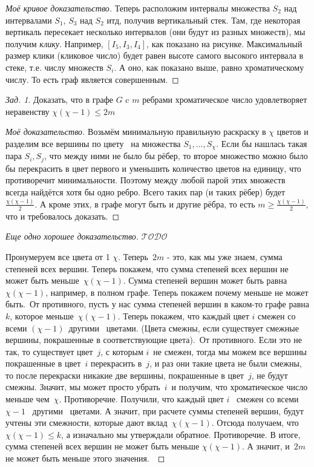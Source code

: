\documentclass[a4paper,12pt]{article}
\numberwithin{figure}{section}
\theoremstyle{remark}
\newtheorem{problem}{Зад.}[section]
\def\iiTODO{\guillemotleft$\mathcal{TODO}$\guillemotright\textellipsis}
\begin{document}
\begin{proof}[Моё кривое доказательство]
	Теперь расположим интервалы множества $S_2$ над интервалами $S_1$, $S_3$ над $S_2$ итд, получив вертикальный стек. Там, где некоторая вертикаль пересекает несколько интервалов (они будут из разных множеств), мы получим \textit{клику}. Например, $[I_5,I_3,I_4]$, как показано на рисунке. Максимальный размер клики (кликовое число) будет равен высоте самого высокого интервала в стеке, т.е. числу множеств $S_i$. А оно, как показано выше, равно хроматическому числу. То есть граф является совершенным.
\end{proof}


\begin{problem}
	Доказать, что в графе $G$ c $m$ ребрами хроматическое число удовлетворяет неравенству $\chi(\chi-1) \leqslant 2m$
\end{problem}

\begin{proof}[Моё доказательство]
	Возьмём минимальную правильную раскраску в $\chi$ цветов и разделим все вершины по цвету  на множества $S_1,...,S_{\chi}$. Если бы нашлась такая пара $S_i,S_j$, что между ними не было бы рёбер, то второе множество можно было бы перекрасить в цвет первого и уменьшить количество цветов на единицу, что противоречит минимальности. Поэтому между любой парой этих множеств всегда найдётся хотя бы одно ребро. Всего таких пар (и таких рёбер) будет $\displaystyle\frac{\chi(\chi-1)}{2}$. А кроме этих, в графе могут быть и другие рёбра, то есть $\displaystyle m \geqslant \frac{\chi(\chi-1)}2$, что и требовалось доказать.
\end{proof}

\begin{proof}[Еще одно хорошее доказательство]
	\iiTODO
	
	Пронумеруем все цвета от 1 $\chi$. Теперь $2m$ - это, как мы уже знаем, сумма степеней всех вершин. Теперь покажем, что сумма степеней всех вершин не может быть меньше $\chi(\chi-1)$.
	Сумма степеней вершин может быть равна $\chi(\chi-1)$, например, в полном графе. Теперь покажем почему меньше не может быть. От противного, пусть у нас сумма степеней вершин в каком-то графе равна $k$, которое меньше $\chi(\chi-1)$.
	Теперь покажем, что каждый цвет $i$ смежен со всеми $(\chi-1)$ другими  цветами. (Цвета смежны, если существует смежные вершины, покрашенные в соответствующие цвета). От противного. Если это не так, то существует цвет $j$, с которым $i$ не смежен, тогда мы можем все вершины покрашенные в цвет $i$ перекрасить в $j$, и раз они такие цвета не были смежны, то после перекраски никакие две вершины, покрашенные в цвет $j$, не будут смежны. Значит, мы может просто убрать $i$ и получим, что хроматическое число меньше чем $\chi$. Противоречие.
	Получили, что каждый цвет $i$  смежен со всеми $\chi-1$  другими  цветами. А значит, при расчете суммы степеней вершин, будут учтены эти смежности, которые дают вклад $\chi(\chi-1)$. Отсюда получаем, что $\chi(\chi-1) \leqslant k$, а изначально мы утверждали обратное. Противоречие.
	В итоге, сумма степеней всех вершин не может быть меньше $\chi(\chi-1)$. А значит, и $2m$ не может быть меньше этого значения. 
\end{proof}
\end{document}
